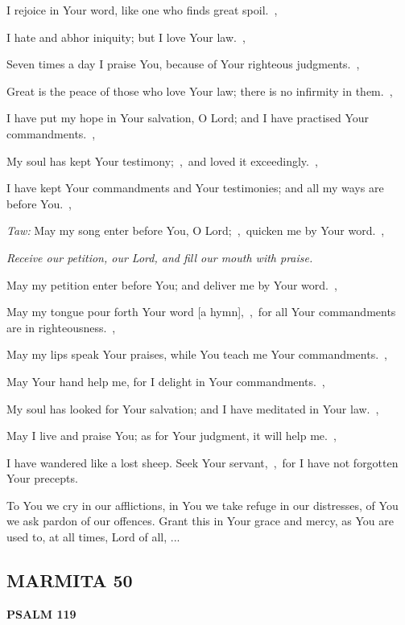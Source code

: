 \documentclass[12pt,twoside,a5paper]{article}
\newcommand{\marmita}[1]{\subsection*{MARMITA {#1}}}
\newcommand{\psalm}[1]{\textbf{PSALM {#1}}\nopagebreak}
\newcommand{\qanona}[1]{{\liturgicalhint{Qanona.} \emph{#1}}}
\newcommand{\slota}[1]{\liturgicalhint{Slota.} #1}
\begin{document}
\begin{normalparskip}
  I rejoice in Your word, like one who finds great spoil.~\sep

  I hate and abhor iniquity; but I love Your law.~\sep

  Seven times a day I praise You, because of Your righteous judgments.~\sep

  Great is the peace of those who love Your law; there is no infirmity in them.~\sep

  I have put my hope in Your salvation, O Lord; and I have practised Your commandments.~\sep

  My soul has kept Your testimony;~\sep\ and loved it exceedingly.~\sep

  I have kept Your commandments and Your testimonies; and all my ways are before You.~\sep

  \emph{Taw:} May my song enter before You, O Lord;~\sep\ quicken me by Your word.~\sep

  \qanona{Receive our petition, our Lord, and fill our mouth with praise.}

  May my petition enter before You; and deliver me by Your word.~\sep

  May my tongue pour forth Your word [a hymn],~\sep\ for all Your commandments are in righteousness.~\sep

  May my lips speak Your praises, while You teach me Your commandments.~\sep

  May Your hand help me, for I delight in Your commandments.~\sep

  My soul has looked for Your salvation; and I have meditated in Your law.~\sep

  May I live and praise You; as for Your judgment, it will help me.~\sep

  I have wandered like a lost sheep. Seek Your servant,~\sep\ for I have not forgotten Your precepts.
\end{normalparskip}

\slota{To You we cry in our afflictions, in You we take refuge in our distresses, of You we ask pardon of our offences. Grant this in Your grace and mercy, as You are used to, at all times, Lord of all, ...}

\marmita{50}

\psalm{119}
\end{document}
